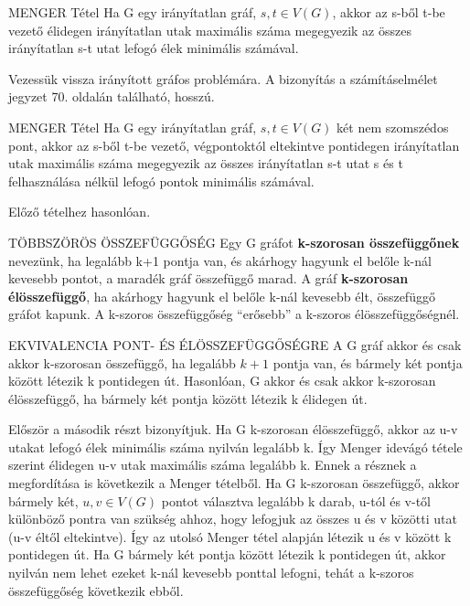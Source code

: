 \begin{tetel}{MENGER Tétel}
Ha G egy irányítatlan gráf, $s,t\in V(G)$, akkor az s-ből t-be vezető élidegen irányítatlan utak maximális száma megegyezik az összes irányítatlan s-t utat lefogó élek minimális számával.
\end{tetel}

\begin{bizonyitas}{}
Vezessük vissza irányított gráfos problémára. A bizonyítás a számításelmélet jegyzet 70. oldalán található, hosszú.
\end{bizonyitas}

\begin{tetel}{MENGER Tétel}
Ha G egy irányítatlan gráf, $s,t\in V(G)$ két nem szomszédos pont, akkor az s-ből t-be vezető, végpontoktól eltekintve pontidegen irányítatlan utak maximális száma megegyezik az összes irányítatlan s-t utat s és t felhasználása nélkül lefogó pontok minimális számával.
\end{tetel}

\begin{bizonyitas}{}
Előző tételhez hasonlóan.
\end{bizonyitas}

\begin{definicio}{TÖBBSZÖRÖS ÖSSZEFÜGGŐSÉG}
Egy G gráfot \textbf{k-szorosan összefüggőnek} nevezünk, ha legalább k+1 pontja van, és akárhogy hagyunk el belőle k-nál kevesebb pontot, a maradék gráf összefüggő marad. A gráf \textbf{k-szorosan élösszefüggő}, ha akárhogy hagyunk el belőle k-nál kevesebb élt, összefüggő gráfot kapunk. A k-szoros összefüggőség ``erősebb'' a k-szoros élösszefüggőségnél.
\end{definicio}

\begin{tetel}{EKVIVALENCIA PONT- ÉS ÉLÖSSZEFÜGGŐSÉGRE}
A G gráf akkor és csak akkor k-szorosan összefüggő, ha legalább $k + 1$ pontja van, és bármely két pontja között létezik k pontidegen út.
Hasonlóan, G akkor és csak akkor k-szorosan élösszefüggő, ha bármely két pontja között létezik k élidegen út.
\end{tetel}

\begin{bizonyitas}{}
Először a második részt bizonyítjuk. Ha G k-szorosan élösszefüggő, akkor az u-v utakat lefogó élek minimális száma nyilván legalább k. Így Menger idevágó tétele szerint élidegen u-v utak maximális száma legalább k. Ennek a résznek a megfordítása is következik a Menger tételből. Ha G k-szorosan összefüggő, akkor bármely két, $u,v\in V(G)$ pontot választva legalább k darab, u-tól és v-től különböző pontra van szükség ahhoz, hogy lefogjuk az összes u és v közötti utat (u-v éltől eltekintve). Így az utolsó Menger tétel alapján létezik u és v között k pontidegen út. Ha G bármely két pontja között létezik k pontidegen út, akkor nyilván nem lehet ezeket k-nál kevesebb ponttal lefogni, tehát a k-szoros összefüggőség következik ebből.
\end{bizonyitas}

